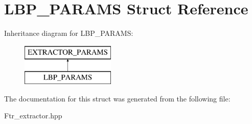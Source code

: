 \hypertarget{struct_l_b_p___p_a_r_a_m_s}{\section{L\+B\+P\+\_\+\+P\+A\+R\+A\+M\+S Struct Reference}
\label{struct_l_b_p___p_a_r_a_m_s}
}
Inheritance diagram for L\+B\+P\+\_\+\+P\+A\+R\+A\+M\+S\+:\begin{figure}[H]
\begin{center}
\leavevmode
\includegraphics[height=2.000000cm]{struct_l_b_p___p_a_r_a_m_s}
\end{center}
\end{figure}


The documentation for this struct was generated from the following file\+:\begin{DoxyCompactItemize}
\item 
Ftr\+\_\+extractor.\+hpp\end{DoxyCompactItemize}
